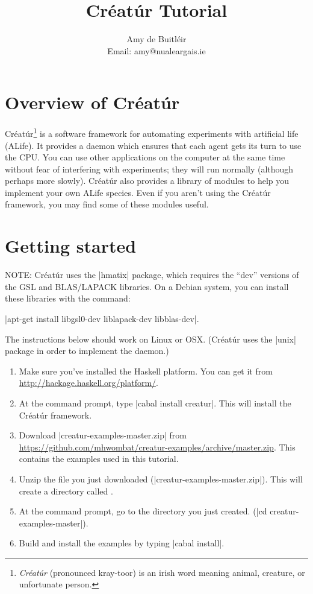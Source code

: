 \documentclass[a4paper,10pt]{report}
\title{Créatúr Tutorial}
\author{Amy de Buitl\'eir\\
        Email: amy@nualeargais.ie}
\begin{document}
\maketitle

\tableofcontents

\chapter{Overview of Créatúr}

Créatúr\footnote{\emph{Créatúr} (pronounced kray-toor) is an irish word 
meaning animal, creature, or unfortunate person.} 
is a software framework for automating experiments
with artificial life (ALife). 
It provides a daemon which ensures that each agent gets its turn 
to use the CPU. 
You can use other applications on the computer at the same time
without fear of interfering with experiments; they
will run normally (although perhaps more slowly).
Créatúr also provides a library of modules to help you implement your own 
ALife species.
Even if you aren't using the Créatúr framework, you may find some of these
modules useful.

\chapter{Getting started}
\label{sec:install}

NOTE: Créatúr uses the |hmatix| package, which requires the ``dev'' versions of the 
GSL and BLAS/LAPACK libraries.
On a Debian system, you can install these libraries with the command:

|apt-get install libgsl0-dev liblapack-dev libblas-dev|.
\bigskip

The instructions below should work on Linux or OSX.
(Créatúr uses the |unix| package in order to implement the daemon.)

\begin{enumerate}
\item Make sure you've installed the Haskell platform. You can get it from
\url{http://hackage.haskell.org/platform/}.

\item At the command prompt, type |cabal install creatur|.
This will install the Créatúr framework.

\item Download |creatur-examples-master.zip| from
\url{https://github.com/mhwombat/creatur-examples/archive/master.zip}.
This contains the examples used in this tutorial.

\item Unzip the file you just downloaded (|creatur-examples-master.zip|).
This will create a directory called .

\item At the command prompt, go to the directory you just created.
(|cd creatur-examples-master|).

\item Build and install the examples by typing |cabal install|.
\end {enumerate}
\end{document}
